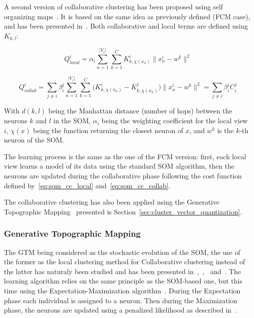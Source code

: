 A second version of collaborative clustering has been proposed using self organizing maps~\cite{kohonen1998self}. It is based on the same idea as previously defined (FCM case), and has been presented in~\cite{grozavu2010topological}. Both collaborative and local terms are defined using $K_{k,l}$:

    \begin{equation}
        Q_{local}^i = \alpha_i \sum_{n=1}^{|V_i|}\sum_{k=1}^C K^i_{k,\chi(x_n)}\|x_n^i - w^k \|^2 
        \label{eq:som_cc_local}
    \end{equation}

    \begin{equation}
        Q_{collab}^i = \sum_{j \neq i}\beta_i^j \sum_{n=1}^{|V_i|}\sum_{k=1}^C \big(K^i_{k,\chi(x_n)} - K^j_{k,\chi(x_n)}\big)\|x_n^i - w^k \|^2 = \sum_{j \neq i} \beta_i^j C_i^j 
        \label{eq:som_cc_collab}
    \end{equation}

    With $d(k,l)$ being the Manhattan distance (number of hops) between the neurons $k$ and $l$ in the SOM, $\alpha_i$ being the weighting coefficient for the local view $i$, $\chi(x)$ being the function returning the closest neuron of $x$, and $w^k$ is the $k$-th neuron of the SOM.\@

    The learning process is the same as the one of the FCM version: first, each local view learns a model of its data using the standard SOM algorithm, then the neurons are updated during the collaborative phase following the cost function defined by~\ref{eq:som_cc_local} and~\ref{eq:som_cc_collab}.

    The collaborative clustering has also been applied using the Generative Topographic Mapping~\cite{bishop1998gtm} presented is Section~\ref{sec:cluster_vector_quantization}.

    \subsubsection{Generative Topographic Mapping}

    The GTM being considered as the stochastic evolution of the SOM, the use of the former as the local clustering method for Collaborative clustering instead of the latter has naturaly been studied and has been presented in~\cite{ghassany2012collaborative},~\cite{sublime2015vertical},~\cite{sublime2015horizontal} and~\cite{sublime2016collaborative}. The learning algorithm relies on the same principle as the SOM-based one, but this time using the Expectation-Maximization algorithm~\cite{dempster1977maximum}. During the Expectation phase each individual is assigned to a neuron. Then during the Maximization phase, the neurons are updated using a penalized likelihood as described in~\cite{green1990use}.\\

